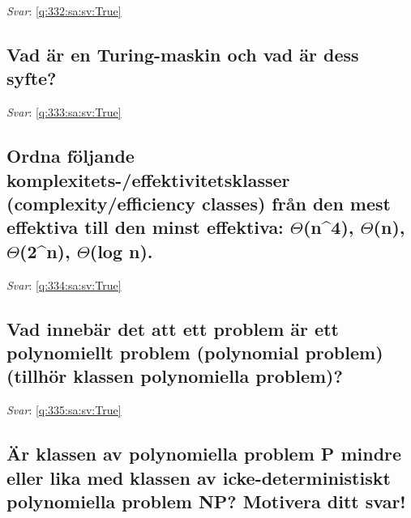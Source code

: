 \documentclass[a4paper,11pt,oneside]{article}
\begin{document}
\begin{sloppypar}
\textit{Svar}: \autoref{q:332:sa:sv:True}



\subsection{Vad \"ar en Turing-maskin och vad \"ar dess syfte?}

\label{q:333:sa:sv:False}

\vspace{2cm}

\noindent\makebox[\textwidth]{\hrulefill}

\vspace{1cm}

\textit{Svar}: \autoref{q:333:sa:sv:True}



\subsection{Ordna f\"oljande komplexitets-/effektivitetsklasser (complexity/efficiency classes) fr\r{a}n den mest effektiva till den minst effektiva: \ensuremath{\Theta}(n^4), \ensuremath{\Theta}(n), \ensuremath{\Theta}(2^n), \ensuremath{\Theta}(log n).}

\label{q:334:sa:sv:False}

\vspace{2cm}

\noindent\makebox[\textwidth]{\hrulefill}

\vspace{1cm}

\textit{Svar}: \autoref{q:334:sa:sv:True}



\subsection{Vad inneb\"ar det att ett problem \"ar ett polynomiellt problem (polynomial problem) (tillh\"or klassen polynomiella problem)?}

\label{q:335:sa:sv:False}

\vspace{2cm}

\noindent\makebox[\textwidth]{\hrulefill}

\vspace{1cm}

\textit{Svar}: \autoref{q:335:sa:sv:True}



\subsection{\"Ar klassen av polynomiella problem P mindre eller lika med klassen av icke-deterministiskt polynomiella problem NP? Motivera ditt svar!}


\end{sloppypar}
\end{document}

